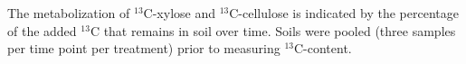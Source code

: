 The metabolization of $^{13}$C-xylose and $^{13}$C-cellulose is indicated by
the percentage of the added $^{13}$C that remains in soil over time. Soils
were pooled (three samples per time point per treatment) prior to measuring
$^{13}$C-content.
